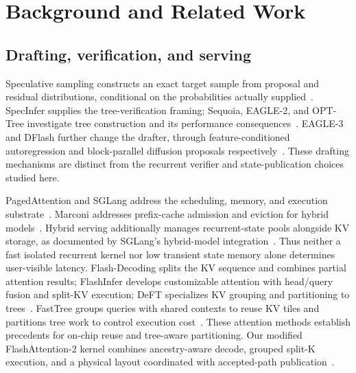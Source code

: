 \documentclass[conference]{IEEEtran}
\begin{document}
\section{Background and Related Work}
\label{sec:related}
\subsection{Drafting, verification, and serving}
Speculative sampling constructs an exact target sample from proposal and residual distributions, conditional on the probabilities actually supplied~\cite{leviathan2023fast,chen2023sampling}. SpecInfer supplies the tree-verification framing; Sequoia, EAGLE-2, and OPT-Tree investigate tree construction and its performance consequences~\cite{miao2023specinfer,chen2024sequoia,li2024eagle,wang2024opt}. EAGLE-3 and DFlash further change the drafter, through feature-conditioned autoregression and block-parallel diffusion proposals respectively~\cite{li2025eagle3,chen2026dflash}. These drafting mechanisms are distinct from the recurrent verifier and state-publication choices studied here.

PagedAttention and SGLang address the scheduling, memory, and execution substrate~\cite{kwon2023efficient,zheng2024sglang}. Marconi addresses prefix-cache admission and eviction for hybrid models~\cite{pan2024marconi}. Hybrid serving additionally manages recurrent-state pools alongside KV storage, as documented by SGLang's hybrid-model integration~\cite{pytorch2025sglang,sglang2026qwen}. Thus neither a fast isolated recurrent kernel nor low transient state memory alone determines user-visible latency. Flash-Decoding splits the KV sequence and combines partial attention results; FlashInfer develops customizable attention with head/query fusion and split-KV execution; DeFT specializes KV grouping and partitioning to trees~\cite{dao2023flashdecoding,ye2025flashinfer,yao2024deft}. FastTree groups queries with shared contexts to reuse KV tiles and partitions tree work to control execution cost~\cite{pan2025fasttree}. These attention methods establish precedents for on-chip reuse and tree-aware partitioning. Our modified FlashAttention-2 kernel combines ancestry-aware decode, grouped split-K execution, and a physical layout coordinated with accepted-path publication~\cite{dao2023flashattention}.
\end{document}
